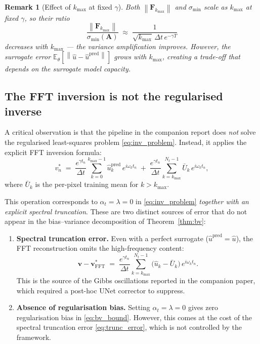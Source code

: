 \documentclass[11pt, a4paper]{article}
\newtheorem{remark}[theorem]{Remark}
\newcommand{\E}{\mathbb{E}}
\newcommand{\norm}[1]{\left\|#1\right\|}
\begin{document}
\begin{remark}[Effect of $k_{\max}$ at fixed $\gamma$]
  Both $\norm{\mathbf{F}_{k_{\max}}}$ and $\sigma_{\min}$ scale as
  $k_{\max}$ at fixed $\gamma$, so their ratio
  \[
    \frac{\norm{\mathbf{F}_{k_{\max}}}}{\sigma_{\min}(\mathbf{A})}
    \;\approx\;
    \frac{1}{\sqrt{k_{\max}}\,\Delta t\,e^{-\gamma T}}
  \]
  \emph{decreases} with $k_{\max}$ --- the variance amplification improves.
  However, the surrogate error $\E_\theta[\norm{\hat{u} -
  \hat{u}^{\mathrm{pred}}}]$ grows with $k_{\max}$, creating a
  trade-off that depends on the surrogate model capacity.
\end{remark}
 
\subsection{The FFT inversion is not the regularised inverse}
 
A critical observation is that the pipeline in the companion report does
\emph{not} solve the regularised least-squares problem
\eqref{eq:inv_problem}. Instead, it applies the explicit FFT inversion
formula:
\begin{equation}
  \label{eq:fft_inv}
  v^*_n \;=\;
  \frac{e^{\gamma t_n}}{\Delta t}
  \sum_{k=0}^{k_{\max}-1} \hat{u}_k^{\mathrm{pred}}\, e^{i\omega_k t_n}
  \;+\;
  \frac{e^{\gamma t_n}}{\Delta t}
  \sum_{k=k_{\max}}^{N_t-1} \bar{U}_k\, e^{i\omega_k t_n},
\end{equation}
where $\bar{U}_k$ is the per-pixel training mean for $k > k_{\max}$.
 
This operation corresponds to $\alpha_t = \lambda = 0$ in
\eqref{eq:inv_problem} \emph{together with an explicit spectral
truncation}. These are two distinct sources of error that do not appear
in the bias--variance decomposition of Theorem~\ref{thm:bv}:
 
\begin{enumerate}
  \item \textbf{Spectral truncation error.}
    Even with a perfect surrogate ($\hat{u}^{\mathrm{pred}} = \hat{u}$),
    the FFT reconstruction omits the high-frequency content:
    \begin{equation}
      \label{eq:trunc_error}
      \mathbf{v} - \mathbf{v}^*_{\mathrm{FFT}}
      \;=\;
      \frac{e^{\gamma t_n}}{\Delta t}
      \sum_{k=k_{\max}}^{N_t-1}
      \bigl(\hat{u}_k - \bar{U}_k\bigr)\, e^{i\omega_k t_n}.
    \end{equation}
    This is the source of the Gibbs oscillations reported in the companion
    paper, which required a post-hoc UNet corrector to suppress.
 
  \item \textbf{Absence of regularisation bias.}
    Setting $\alpha_t = \lambda = 0$ gives zero regularisation bias in
    \eqref{eq:bv_bound}. However, this comes at the cost of the spectral
    truncation error \eqref{eq:trunc_error}, which is not controlled by
    the framework.
\end{enumerate}
 
\end{document}
